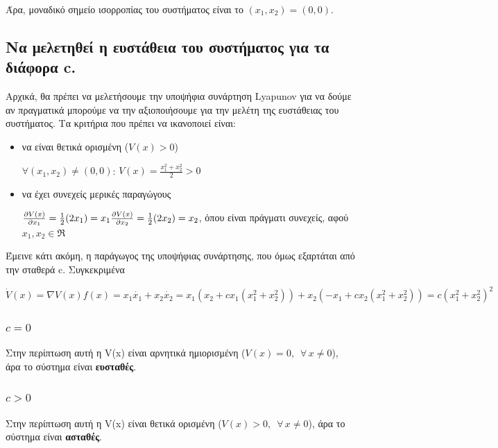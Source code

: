 \documentclass{article}
\begin{document}
\hfill\break
Άρα, μοναδικό σημείο ισορροπίας του συστήματος είναι το \((x_1, x_2) = (0, 0)\).

\subsection{Να μελετηθεί η ευστάθεια του συστήματος για τα διάφορα c.}
Αρχικά, θα πρέπει να μελετήσουμε την υποψήφια συνάρτηση Lyapunov για να δούμε αν πραγματικά μπορούμε να την αξιοποιήσουμε για την μελέτη της ευστάθειας του συστήματος. Τα κριτήρια που πρέπει να ικανοποιεί είναι:

\begin{itemize}
    \item να είναι θετικά ορισμένη (\(V(x) > 0\))

    \hfill\break    
    \(\forall (x_1, x_2) \neq (0, 0) \): \(V(x) = \frac{x_1^2+x_2^2}{2} > 0\)
    \item να έχει συνεχείς μερικές παραγώγους
    
    \hfill\break
    \begin{math}
        \frac{\partial V(x)}{\partial x_1} = \frac{1}{2}(2x_1) = x_1 \\[10pt]
        \frac{\partial V(x)}{\partial x_2} = \frac{1}{2}(2x_2) = x_2
    \end{math}, όπου είναι πράγματι συνεχείς, αφού \(x_1, x_2 \in \Re\)
\end{itemize}

\hfill\break
Έμεινε κάτι ακόμη, η παράγωγος της υποψήφιας συνάρτησης, που όμως εξαρτάται από την σταθερά c. Συγκεκριμένα

\hfill\break
\begin{math}
    \dot{V}(x) = \nabla V(x) f(x) = x_1 \dot{x_1} + x_2 \dot{x_2} = x_1 (x_2 + c x_1 (x_1^2 + x_2^2)) + x_2 (- x_1 + c x_2 (x_1^2 + x_2^2)) = c (x_1^2 + x_2^2)^2
\end{math}

\subsubsection{\textbf{\(c = 0\)}}
Στην περίπτωση αυτή η V(x) είναι αρνητικά ημιορισμένη (\(V(x) = 0,\,\,\,\forall\,x \neq 0\)), άρα το σύστημα είναι \textbf{ευσταθές}.

\subsubsection{\textbf{\(c > 0\)}}
Στην περίπτωση αυτή η V(x) είναι θετικά ορισμένη (\(V(x) > 0,\,\,\,\forall\,x \neq 0\)), άρα το σύστημα είναι \textbf{ασταθές}.
\end{document}
